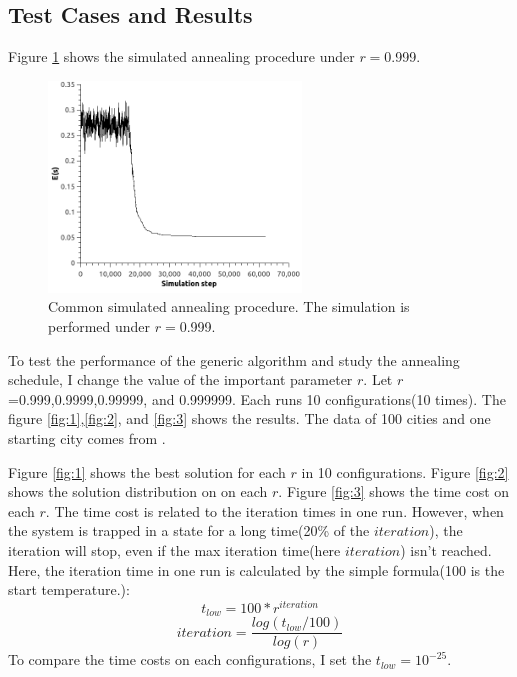 \documentclass[10.5pt,a4paper]{article}
\begin{document}
\subsection{Test Cases and Results}
Figure \ref{fig:4} shows the simulated annealing procedure under $r=$0.999.
\begin{figure}[H]
\centering
\includegraphics[width=0.6\textwidth]{../result/SA_1_1_procedure.png}
\caption{Common simulated annealing procedure. The simulation is performed under $r=$0.999.}
\label{fig:4}
\end{figure}

To test the performance of the generic algorithm and study the annealing schedule, I change the value of the important parameter $r$. Let $r$=0.999,0.9999,0.99999, and 0.999999. Each runs 10 configurations(10 times). The figure \ref{fig:1},\ref{fig:2}, and \ref{fig:3} shows the results. The data of 100 cities and one starting city comes from \cite{4}.

Figure \ref{fig:1} shows the best solution for each $r$ in 10 configurations. Figure \ref{fig:2} shows the solution distribution on on each $r$. Figure \ref{fig:3} shows the time cost on each $r$. The time cost is related to the iteration times in one run. However, when the system is trapped in a state for a long time(20\% of the $iteration$), the iteration will stop, even if the max iteration time(here $iteration$) isn't reached. Here, the iteration time in one run is calculated by the simple formula(100 is the start temperature.):
$$t_{low}=100*r^{iteration}$$
$$iteration=\frac{log(t_{low}/100)}{log(r)}$$
To compare the time costs on each configurations, I set the $t_{low}=10^{-25}$.
\end{document}
